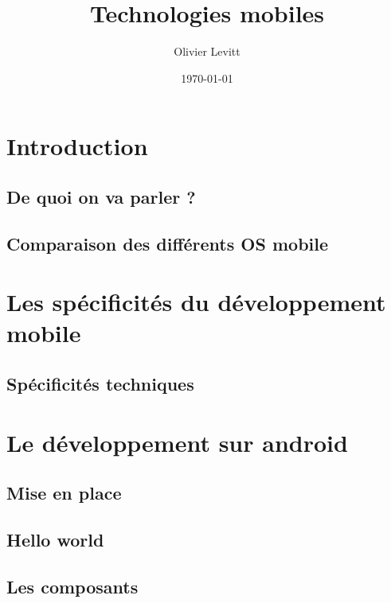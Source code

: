 \documentclass{beamer}
\begin{document}
\title{Technologies mobiles} 
\author{Olivier Levitt} 
\date{\today} 



\section{Introduction} 
\subsection{De quoi on va parler ?}
\subsection{Comparaison des différents OS mobile}

\section{Les spécificités du développement mobile} 
\subsection{Spécificités techniques}

\section{Le développement sur android} 
\subsection{Mise en place}
\subsection{Hello world}
\subsection{Les composants}



\end{document}
